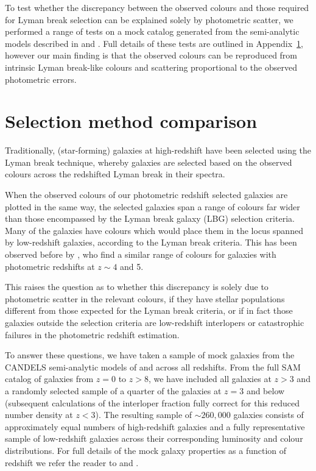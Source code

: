 To test whether the discrepancy between the observed colours and those required for Lyman break selection can be explained solely by photometric scatter, we performed a range of tests on a mock catalog generated from the semi-analytic models described in \citet{Somerville:2008ed} and \citet{Somerville:2012cq}. Full details of these tests are outlined in Appendix~\ref{app:selection}, however our main finding is that the observed colours can be reproduced from intrinsic Lyman break-like colours and scattering proportional to the observed photometric errors. 

\section{Selection method comparison}\label{app:selection}
Traditionally, (star-forming) galaxies at high-redshift have been selected using the Lyman break technique, whereby galaxies are selected based on the observed colours across the redshifted Lyman break in their spectra.

When the observed colours of our photometric redshift selected galaxies are plotted in the same way, the selected galaxies span a range of colours far wider than those encompassed by the Lyman break galaxy (LBG) selection criteria. Many of the galaxies have colours which would place them in the locus spanned by low-redshift galaxies, according to the Lyman break criteria. This has been observed before by \citet{2010ApJ...724..425D}, who find a similar range of colours for galaxies with photometric redshifts at $z \sim 4$ and 5.

This raises the question as to whether this discrepancy is solely due to photometric scatter in the relevant colours, if they have stellar populations different from those expected for the Lyman break criteria, or if in fact those galaxies outside the selection criteria are low-redshift interlopers or catastrophic failures in the photometric redshift estimation.

To answer these questions, we have taken a sample of mock galaxies from the CANDELS semi-analytic models of \citet{Somerville:2008ed} and \citet{Somerville:2012cq} across all redshifts. From the full SAM catalog of galaxies from $z = 0$ to $z > 8$, we have included all galaxies at $z > 3$ and a randomly selected sample of a quarter of the galaxies at $z = 3$ and below (subsequent calculations of the interloper fraction fully correct for this reduced number density at $z < 3$). The resulting sample of $\sim 260,000$ galaxies consists of approximately equal numbers of high-redshift galaxies and a fully representative sample of low-redshift galaxies across their corresponding luminosity and colour distributions. For full details of the mock galaxy properties as a function of redshift we refer the reader to \citet{Somerville:2008ed} and \citet{Lu:2013ui}.

